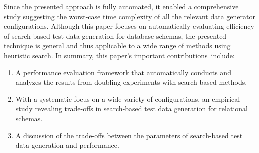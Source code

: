 Since the presented approach is fully automated, it enabled a comprehensive study suggesting the worst-case time
complexity of all the relevant data generator configurations. Although this paper focuses on automatically evaluating
efficiency of search-based test data generation for database schemas, the presented technique is general and thus
applicable to a wide range of methods using heuristic search. In summary, this paper's important \mbox{contributions
include}:



\begin{enumerate}
  \itemsep0in

  \item A performance evaluation framework that automatically conducts and analyzes the results from doubling
    experiments with search-based methods.

  \item With a systematic focus on a wide variety of configurations, an empirical study revealing trade-offs
    in search-based test data generation for relational schemas.

  \item A discussion of the trade-offs between the parameters of
    search-based test data generation and performance.

  \end{enumerate}
